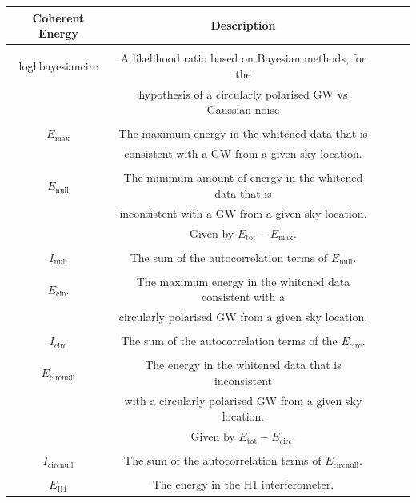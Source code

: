 \documentclass[12pt,twoside,a4paper]{report}
\begin{document}
 \begin{table}
\begin{tabular}{| c | c | c | c | c |} 
 \hline
\textbf{Coherent Energy }& \textbf{Description}  \\ [0.5ex] 
 \hline\hline
& \\ 
loghbayesiancirc & A likelihood ratio based on Bayesian methods, for the \\ & hypothesis of a circularly polarised GW vs Gaussian noise  \\

\hline
& \\
$E_\text{max}$ & The maximum energy in the whitened data that is \\ & consistent with a GW from a given sky location. \\

\hline
& \\
$E_\text{null}$& The minimum amount of energy in the whitened data that is\\ & inconsistent with a GW from a given sky location. \\ & Given by $E_\text{tot}-E_\text{max}$. \\
\hline
& \\
$I_\text{null}$& The sum of the autocorrelation terms of $E_\text{null}$. \\

\hline
& \\
$E_\text{circ}$ & The maximum energy in the whitened data consistent with a\\ & circularly polarised GW from a given sky location.  \\
\hline
& \\
$I_\text{circ}$ & The sum of the autocorrelation terms of the $E_\text{circ}$. \\

\hline
& \\
$E_\text{circnull}$ & The energy in the whitened data that is inconsistent \\ & with a circularly polarised GW from a given sky location. \\ & Given by $E_\text{tot}-E_\text{circ}$. \\

\hline
& \\
$I_\text{circnull}$& The sum of the autocorrelation terms of $E_\text{circnull}$.  \\
\hline
& \\
$E_\text{H1}$& The energy in the H1 interferometer. \\


\end{tabular}
\end{table}
\end{document}
